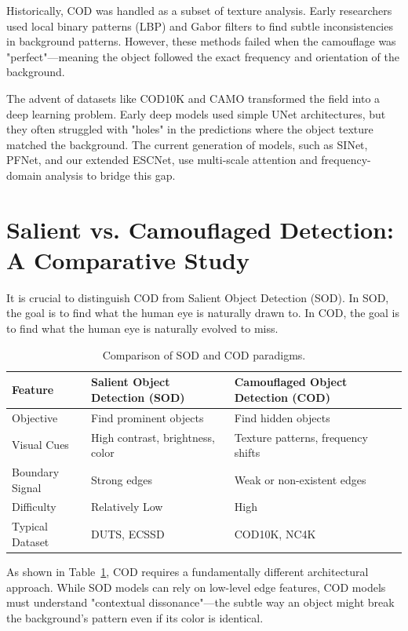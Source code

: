 \documentclass[12pt,a4paper]{report}
\begin{document}
Historically, COD was handled as a subset of texture analysis. Early researchers used local binary patterns (LBP) and Gabor filters to find subtle inconsistencies in background patterns. However, these methods failed when the camouflage was "perfect"—meaning the object followed the exact frequency and orientation of the background. 

The advent of datasets like COD10K and CAMO transformed the field into a deep learning problem. Early deep models used simple UNet architectures, but they often struggled with "holes" in the predictions where the object texture matched the background. The current generation of models, such as SINet, PFNet, and our extended ESCNet, use multi-scale attention and frequency-domain analysis to bridge this gap.

\section{Salient vs. Camouflaged Detection: A Comparative Study}

It is crucial to distinguish COD from Salient Object Detection (SOD). In SOD, the goal is to find what the human eye is naturally drawn to. In COD, the goal is to find what the human eye is naturally evolved to miss. 

\begin{table}[H]
\centering
\caption{Comparison of SOD and COD paradigms.}
\label{tab:sodcod}
\begin{tabular}{@{}lll@{}}
\toprule
\textbf{Feature} & \textbf{Salient Object Detection (SOD)} & \textbf{Camouflaged Object Detection (COD)} \\
\midrule
Objective        & Find prominent objects                  & Find hidden objects \\
Visual Cues      & High contrast, brightness, color        & Texture patterns, frequency shifts \\
Boundary Signal  & Strong edges                            & Weak or non-existent edges \\
Difficulty       & Relatively Low                          & High \\
Typical Dataset  & DUTS, ECSSD                             & COD10K, NC4K \\
\bottomrule
\end{tabular}
\end{table}

As shown in Table~\ref{tab:sodcod}, COD requires a fundamentally different architectural approach. While SOD models can rely on low-level edge features, COD models must understand "contextual dissonance"—the subtle way an object might break the background's pattern even if its color is identical.
\end{document}
